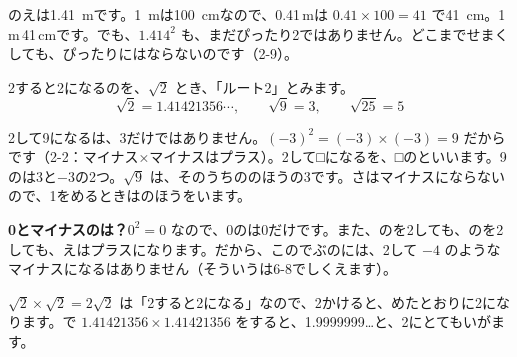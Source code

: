 \bkhatenaref のえは\qty{1.41}{m}です。\qty{1}{m}は\qty{100}{cm}なので、0.41\,mは $0.41\times100=41$ で\qty{41}{cm}。1\,m\,41\,cmです。でも、$1.414^2$ も、まだぴったり2ではありません。どこまでせまくしても、ぴったりにはならないのです（2-9）。


\leavevmode\label{bk:2-8:root}2すると2になるのを、$\sqrt{2}$ とき、「ルート2」とみます。
\[ \sqrt{2}=1.41421356\cdots,\qquad \sqrt{9}=3,\qquad \sqrt{25}=5 \]

\noindent\begin{minipage}[c]{0.64\linewidth}
2して9になるは、3だけではありません。$(-3)^2=(-3)\times(-3)=9$ だからです（2-2：マイナス×マイナスはプラス）。2して□になるを、□の\textbf{}といいます。9のは3と$-3$の2つ。$\sqrt{9}$ は、そのうちののほうの3です。さはマイナスにならないので、1をめるときはのほうをいます。
\end{minipage}\hfill
\begin{minipage}[c]{0.33\linewidth}\centering
{}
\end{minipage}

\noindent\textbf{0とマイナスのは？}\quad $0^2=0$ なので、0のは0だけです。また、のを2しても、のを2しても、えはプラスになります。だから、このでぶのには、2して $-4$ のようなマイナスになるはありません（そういうは6-8でしくえます）。

\noindent\textbf{$\sqrt{2}\times\sqrt{2}=2$}\quad $\sqrt{2}$ は「2すると2になる」なので、2かけると、めたとおりに2になります。で $1.41421356\times1.41421356$ をすると、1.9999999…と、2にとてもいがます。

